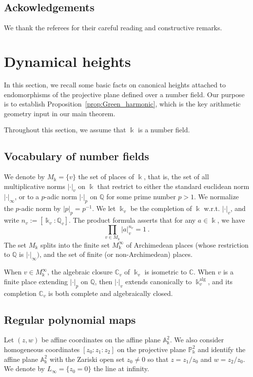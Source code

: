 \documentclass[11 pt, oneside, a4paper]{amsart}
\newcommand{\C}{\mathbb{C}}
\newcommand{\Q}{\mathbb{Q}}
\newcommand{\nA}{\mathbb{A}}
\newcommand{\nP}{\mathbb{P}}
\newcommand{\abs}[1]{{\left|{#1}\right|}}
\newcommand{\nk}{\Bbbk}
\DeclareMathOperator{\alg}{alg}
\theoremstyle{definition}
\theoremstyle{definition}
\begin{document}
\subsection*{Ackowledgements} 
{We thank the referees for their careful reading and 
 constructive remarks.  
 }
 
\section{Dynamical heights} \label{sec:heights}

In this section, we recall some basic facts on canonical heights attached to 
endomorphisms of the projective plane defined over a number field. Our purpose is to establish 
Proposition~\ref{prop:Green_harmonic}, which is the key arithmetic geometry input in our main theorem. 
 
 
Throughout this section, we assume that  $\nk$ is 
a number field. 

\subsection{Vocabulary of number fields}
We denote by $M_\nk =\{ v\}$ the set of places of $\nk$, that is,  the set of all 
multiplicative norms $|\cdot|_v$ on $\nk$ that restrict to either the standard euclidean norm $|\cdot|_\infty$, or to a $p$-adic norm
$|\cdot|_p$ on $\Q$ for some prime number $p>1$. We normalize the $p$-adic norm by 
$|p|_p= p^{-1}$. We let $\nk_v$ be the completion of $\nk$ w.r.t. $|\cdot|_v$, and write $n_v:= [\nk_v:\Q_v]$. 
The product formula asserts that  
for any $a \in \nk$, we have
\[
  \prod_{v\in M_\nk}\abs{a}^{n_v}_v=1~.
\]
The set $M_\nk$ splits into the finite set $M^\infty_\nk$ of Archimedean places (whose restriction to $\Q$ is $|\cdot|_\infty)$, 
and the set of finite (or non-Archimedean) places. 

When $v\in M^\infty_\nk$, the algebraic closure 
$\C_v$ of $\nk_v$ is isometric to $\C$. When $v$ is a finite place extending $|\cdot|_p$ on $\Q$, then $|\cdot|_v$ extends canonically to 
$\nk_v^{\alg}$, and its completion $\C_v$ 
is both complete and algebraically closed.

\subsection{Regular polynomial maps}
Let $(z,w)$ be affine coordinates on the affine plane $\nA_\nk^2$. 
We also consider homogeneous coordinates $[z_0:z_1:z_2]$ on the projective plane $\nP_\nk^2$
and identify the affine plane $\nA_\nk^2$ with the Zariski open set $z_0\neq 0$ so that 
$z = z_1/z_0$ and $w= z_2/z_0$. We denote by $L_\infty = \{ z_0 =0\}$ the line at infinity.  
\end{document}
